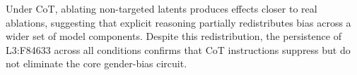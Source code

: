 \documentclass[11pt]{article}
\begin{document}
Under CoT, ablating non-targeted latents produces effects closer to real ablations, suggesting that explicit reasoning partially redistributes bias across a wider set of model components. Despite this redistribution, the persistence of L3:F84633 across all conditions confirms that CoT instructions suppress but do not eliminate the core gender-bias circuit.








\end{document}
